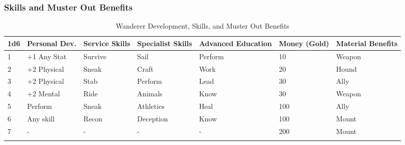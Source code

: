 \documentclass[itdr/core]{subfiles}
\begin{document}
\subsubsection{Skills and Muster Out Benefits}
\begin{longtable}{p{} p{} p{} p{} p{} p{} p{}}
\hline
\textbf{1d6} & \textbf{Personal Dev.} & \textbf{Service Skills} & \textbf{Specialist Skills} & \textbf{Advanced Education} & \textbf{Money (Gold)} & \textbf{Material Benefits} \\
\hline
1 & +1 Any Stat & Survive & Sail & Perform & 10 & Weapon \\
2 & +2 Physical & Sneak & Craft & Work & 20 & Hound \\
3 & +2 Physical & Stab & Perform & Lead & 30 & Ally \\
4 & +2 Mental & Ride & Animals & Know & 30 & Weapon \\
5 & Perform & Sneak & Athletics & Heal & 100 & Ally \\
6 & Any skill & Recon & Deception & Know & 100 & Mount \\
7 & - & - & - & - & 200 & Mount \\
\hline
\caption{Wanderer Development, Skills, and Muster Out Benefits}
\end{longtable}
\end{document}
